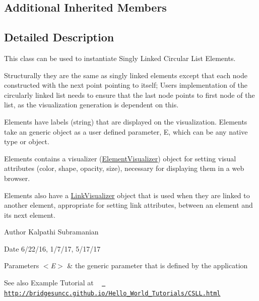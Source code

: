 \subsection*{Additional Inherited Members}


\subsection{Detailed Description}
This class can be used to instantiate Singly Linked Circular List Elements. 

Structurally they are the same as singly linked elements except that each node constructed with the next point pointing to itself; User\textquotesingle{}s implementation of the circularly linked list needs to ensure that the last node points to first node of the list, as the visualization generation is dependent on this.

Elements have labels (string) that are displayed on the visualization. Elements take an generic object as a user defined parameter, E, which can be any native type or object.

Elements contains a visualizer (\mbox{\hyperlink{classbridges_1_1base_1_1_element_visualizer}{Element\+Visualizer}}) object for setting visual attributes (color, shape, opacity, size), necessary for displaying them in a web browser.

Elements also have a \mbox{\hyperlink{classbridges_1_1base_1_1_link_visualizer}{Link\+Visualizer}} object that is used when they are linked to another element, appropriate for setting link attributes, between an element and its next element.

\begin{DoxyAuthor}{Author}
Kalpathi Subramanian
\end{DoxyAuthor}
\begin{DoxyDate}{Date}
6/22/16, 1/7/17, 5/17/17
\end{DoxyDate}

\begin{DoxyParams}{Parameters}
{\em $<$\+E$>$} & the generic parameter that is defined by the application\\
\hline
\end{DoxyParams}
\begin{DoxySeeAlso}{See also}
Example Tutorial at ~\newline
 \href{http://bridgesuncc.github.io/Hello_World_Tutorials/CSLL.html}{\texttt{ http\+://bridgesuncc.\+github.\+io/\+Hello\+\_\+\+World\+\_\+\+Tutorials/\+C\+S\+L\+L.\+html}} 
\end{DoxySeeAlso}


